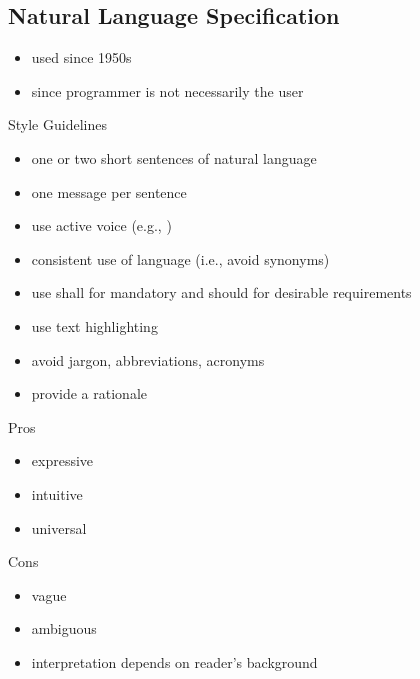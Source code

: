 \subsection{Natural Language Specification}
\begin{frame}{\insertsubsection}
	\begin{fancycolumns}[widths={55}]
		\begin{definition}{}
			\begin{itemize}
				\item used since 1950s
				\item since programmer is not necessarily the user
			\end{itemize}
		\end{definition}
		\begin{example}{Style Guidelines}
			\begin{itemize}
				\item one or two short sentences of natural language
				\item one message per sentence
				\item use active voice (e.g., )
				\item consistent use of language (i.e., avoid synonyms)
				\item use shall for mandatory and should for desirable requirements
				\item use text highlighting
				\item avoid jargon, abbreviations, acronyms
				\item provide a rationale
			\end{itemize}
		\end{example}
		\nextcolumn
		\begin{note}{Pros}
			\begin{itemize}
				\item expressive
				\item intuitive
				\item universal
			\end{itemize}
		\end{note}
		\begin{note}{Cons}
			\begin{itemize}
				\item vague 
				\item ambiguous 
				\item interpretation depends on reader's background
			\end{itemize}
		\end{note}
	\end{fancycolumns}
\end{frame}

